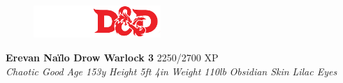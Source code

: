 \documentclass[letterpaper]{article}
\newcommand{\e}[1]{\emph{#1}}
\newcommand{\B}[1]{\textbf{#1}}
\begin{document}
\sffamily
\begin{figure}
    \vspace{-1.5em}
    \includegraphics[width=13em]{5e}
\end{figure}
\B{\huge{Erevan Na\"ilo} \Large{Drow Warlock 3}} \hspace{1em} 2250/2700 XP \\
\e{Chaotic Good} \hspace{1em} \e{Age 153y} \hspace{1em} \e{Height 5ft 4in} \hspace{1em} \e{Weight 110lb} \hspace{1em} \e{Obsidian Skin} \hspace{1em} \e{Lilac Eyes} \par
\end{document}
